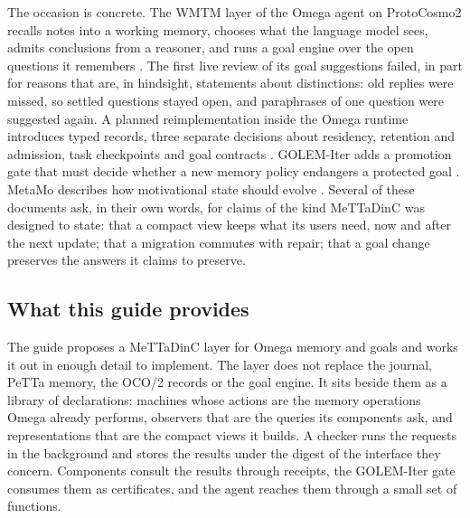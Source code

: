 \documentclass[11pt]{article}
\theoremstyle{definition}
\theoremstyle{plain}
\begin{document}
The occasion is concrete. The WMTM layer of the Omega agent on ProtoCosmo2 recalls notes into a
working memory, chooses what the language model sees, admits conclusions from a reasoner, and runs
a goal engine over the open questions it remembers \cite{wmtm}. The first live review of its goal
suggestions failed, in part for reasons that are, in hindsight, statements about distinctions: old
replies were missed, so settled questions stayed open, and paraphrases of one question were
suggested again. A planned reimplementation inside the Omega runtime introduces typed records,
three separate decisions about residency, retention and admission, task checkpoints and goal
contracts \cite{oco2}. GOLEM-Iter adds a promotion gate that must decide whether a new memory policy
endangers a protected goal \cite{golemspec}. MetaMo describes how motivational state should evolve
\cite{metamo1,metamo2}. Several of these documents ask, in their own words, for claims of the kind
MeTTaDinC was designed to state: that a compact view keeps what its users need, now and after the
next update; that a migration commutes with repair; that a goal change preserves the answers it
claims to preserve.

\subsection{What this guide provides}

The guide proposes a MeTTaDinC layer for Omega memory and goals and works it out in enough detail
to implement. The layer does not replace the journal, PeTTa memory, the OCO/2 records or the goal
engine. It sits beside them as a library of declarations: machines whose actions are the memory
operations Omega already performs, observers that are the queries its components ask, and
representations that are the compact views it builds. A checker runs the requests in the
background and stores the results under the digest of the interface they concern. Components
consult the results through receipts, the GOLEM-Iter gate consumes them as certificates, and the
agent reaches them through a small set of functions.
\end{document}
